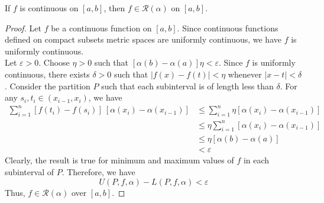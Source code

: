\begin{theorem}
	If $f$ is continuous on $[a,b]$, then $f \in \mathscr{R}(\alpha)$ on $[a,b]$.
\end{theorem}
\begin{proof}
	Let $f$ be a continuous function on $[a,b]$.
	Since continuous functions defined on compact subsets metric spaces are uniformly continuous, we have $f$ is uniformly continuous.\\

	Let $\varepsilon > 0$.
	Choose $\eta > 0$ such that $[\alpha(b)-\alpha(a)]\eta < \varepsilon$.
	Since $f$ is uniformly continuous, there exists $\delta > 0$ such that $|f(x)-f(t)| < \eta$ whenever $|x-t| < \delta$.	
	Consider the partition $P$ such that each subinterval is of length less than $\delta$.
	For any $s_i,t_i \in (x_{i-1},x_i)$, we have
	\begin{align*}
		\sum_{i=1}^n [f(t_i) - f(s_i)] \ [\alpha(x_i)-\alpha(x_{i-1})] 
		& \le \sum_{i=1}^n \eta [\alpha(x_i)-\alpha(x_{i-1})] \\
		& \le \eta \sum_{i=1}^n [\alpha(x_i)-\alpha(x_{i-1})] \\
		&	\le \eta[\alpha(b)-\alpha(a)] \\
		& < \varepsilon 
	\end{align*}
	Clearly, the result is true for minimum and maximum values of $f$ in each subinterval of $P$.
	Therefore, we have
	\[ U(P,f,\alpha) - L(P,f,\alpha) < \varepsilon \]
	Thus, $f \in \mathscr{R}(\alpha)$ over $[a,b]$.
\end{proof}

